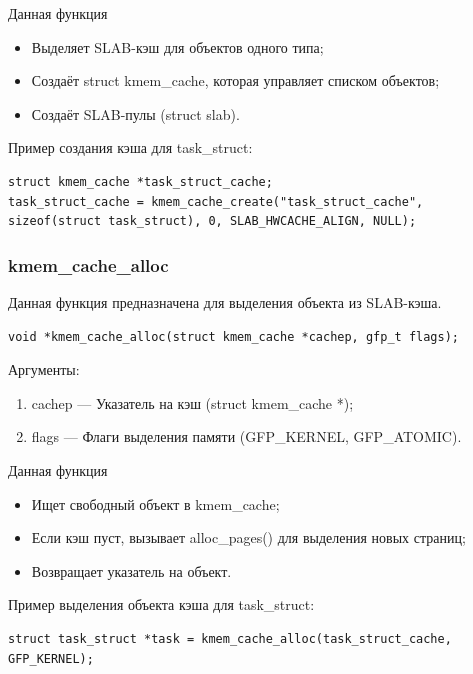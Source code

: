 Данная функция
\begin{itemize}
    \item Выделяет SLAB-кэш для объектов одного типа;
    \item Создаёт struct kmem\_cache, которая управляет списком объектов;
    \item Создаёт SLAB-пулы (struct slab).
\end{itemize}

Пример создания кэша для task\_struct:

\begin{lstlisting}
struct kmem_cache *task_struct_cache;
task_struct_cache = kmem_cache_create("task_struct_cache", sizeof(struct task_struct), 0, SLAB_HWCACHE_ALIGN, NULL);
\end{lstlisting}

\subsubsection*{kmem\_cache\_alloc}

Данная функция предназначена для выделения объекта из SLAB-кэша.
\begin{lstlisting}
void *kmem_cache_alloc(struct kmem_cache *cachep, gfp_t flags);
\end{lstlisting}

Аргументы:
\begin{enumerate}
    \item cachep --- Указатель на кэш (struct kmem\_cache *);
    \item flags --- Флаги выделения памяти (GFP\_KERNEL, GFP\_ATOMIC).
\end{enumerate}

Данная функция
\begin{itemize}
    \item Ищет свободный объект в kmem\_cache;
    \item Если кэш пуст, вызывает alloc\_pages() для выделения новых страниц;
    \item Возвращает указатель на объект.
\end{itemize}

Пример выделения объекта кэша для task\_struct:

\begin{lstlisting}
struct task_struct *task = kmem_cache_alloc(task_struct_cache, GFP_KERNEL);
\end{lstlisting}

